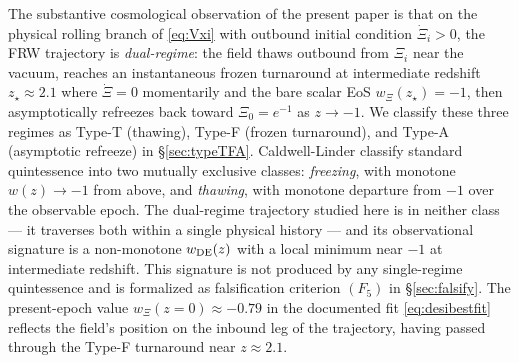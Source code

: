 \documentclass[11pt,reqno]{amsart}
\theoremstyle{plain}
\theoremstyle{definition}
\theoremstyle{remark}
\begin{document}
The substantive cosmological observation of the present paper is that on
the physical rolling branch of \eqref{eq:Vxi} with outbound initial
condition $\dot\Xi_i > 0$, the FRW trajectory is \emph{dual-regime}: the
field thaws outbound from $\Xi_i$ near the vacuum, reaches an
instantaneous frozen turnaround at intermediate redshift $z_\star
\approx 2.1$ where $\dot\Xi = 0$ momentarily and the bare scalar EoS
$w_\Xi(z_\star) = -1$, then asymptotically refreezes back toward
$\Xi_0 = e^{-1}$ as $z \to -1$. We classify these three regimes as
Type-T (thawing), Type-F (frozen turnaround), and Type-A (asymptotic
refreeze) in \S\ref{sec:typeTFA}. Caldwell-Linder
\cite{CaldwellLinder2005} classify standard quintessence into two
mutually exclusive classes: \emph{freezing}, with monotone $w(z) \to -1$
from above, and \emph{thawing}, with monotone departure from $-1$ over
the observable epoch. The dual-regime trajectory studied here is in
neither class --- it traverses both within a single physical history
--- and its observational signature is a non-monotone $w_{\rm DE}(z)$
with a local minimum near $-1$ at intermediate redshift. This signature
is not produced by any single-regime quintessence and is formalized as
falsification criterion $(F_5)$ in \S\ref{sec:falsify}. The
present-epoch value $w_\Xi(z=0) \approx -0.79$ in the documented fit
\eqref{eq:desibestfit} reflects the field's position on the inbound leg
of the trajectory, having passed through the Type-F turnaround near
$z \approx 2.1$.
\end{document}
